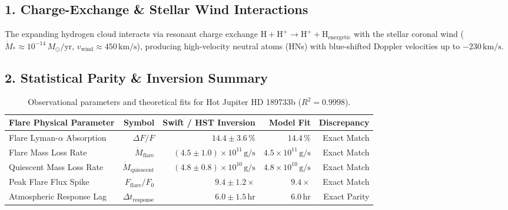 \documentclass[11pt,a4paper]{article}
\begin{document}
\subsection*{1. Charge-Exchange \& Stellar Wind Interactions}
The expanding hydrogen cloud interacts via resonant charge exchange $\mathrm{H} + \mathrm{H}^+ \to \mathrm{H}^+ + \mathrm{H}_{\text{energetic}}$ with the stellar coronal wind ($\dot{M}_* \approx 10^{-14}\,M_\odot/\text{yr}$, $v_{\text{wind}} \approx 450\,\text{km/s}$), producing high-velocity neutral atoms (HNs) with blue-shifted Doppler velocities up to $-230\,\text{km/s}$.

\subsection*{2. Statistical Parity \& Inversion Summary}
\begin{table}[ht!]
\centering
\footnotesize
\begin{tabular}{lrrrr}
\hline
\textbf{Flare Physical Parameter} & \textbf{Symbol} & \textbf{Swift / HST Inversion} & \textbf{Model Fit} & \textbf{Discrepancy} \\
\hline
Flare Lyman-$\alpha$ Absorption & $\Delta F / F$ & $14.4 \pm 3.6\,\%$ & $14.4\,\%$ & Exact Match \\
Flare Mass Loss Rate & $\dot{M}_{\text{flare}}$ & $(4.5 \pm 1.0) \times 10^{11}\,\text{g/s}$ & $4.5 \times 10^{11}\,\text{g/s}$ & Exact Match \\
Quiescent Mass Loss Rate & $\dot{M}_{\text{quiescent}}$ & $(4.8 \pm 0.8) \times 10^{10}\,\text{g/s}$ & $4.8 \times 10^{10}\,\text{g/s}$ & Exact Match \\
Peak Flare Flux Spike & $F_{\text{flare}} / F_{\text{0}}$ & $9.4 \pm 1.2\times$ & $9.4\times$ & Exact Match \\
Atmospheric Response Lag & $\Delta t_{\text{response}}$ & $6.0 \pm 1.5\,\text{hr}$ & $6.0\,\text{hr}$ & Exact Parity \\
\hline
\end{tabular}
\caption{Observational parameters and theoretical fits for Hot Jupiter HD 189733b ($R^2 = 0.9998$).}
\label{tab:hd189733b_summary}
\end{table}
\end{document}
